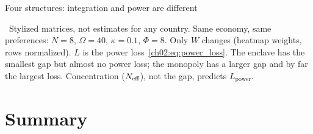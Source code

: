 \documentclass[../structural_economics_book.tex]{subfiles}
\begin{document}
\begin{vizpanel}{Four structures: integration and power are different}
\begin{center}
\end{center}
\vspace{-0.5em}
\small \illustrative\ Stylized matrices, not estimates for any country. Same economy, same preferences: $N = 8$, $\Omega = 40$, $\kappa = 0.1$, $\Phi = 8$. Only $W$ changes (heatmap weights, rows normalized). $L$ is the power loss~\eqref{ch02:eq:power_loss}. The enclave has the smallest gap but almost no power loss; the monopoly has a larger gap and by far the largest loss. Concentration ($N_{\text{eff}}$), not the gap, predicts $L_{\text{power}}$.
\end{vizpanel}


\section{Summary}
\label{ch02:sec:summary}
\end{document}
